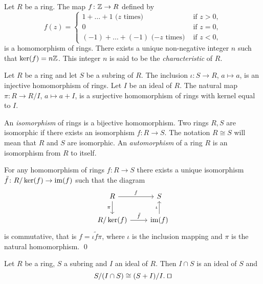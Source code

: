 \begin{example}
Let  $R$ be a ring. The map $f\colon \mathbb{Z}\rightarrow R$ defined by
\[
f(z)=\begin{cases}
    1+\dots +1\mbox{ ($z$ times)}&\mbox{ if } z>0,\\
    0 &\mbox{ if } z=0,\\
    (-1)+\dots+(-1) \mbox{ ($-z$ times)}&\mbox{ if } z<0,
    \end{cases}
\]
is a homomorphism of rings. There exists a unique non-negative integer $n$ such that
$\ker(f)=n\mathbb{Z}$. 
This integer $n$ is said to be the {\em characteristic} of $R$.
\end{example}

\begin{example} 
Let $R$ be a ring and let $S$ be a subring of $R$. The inclusion $\iota\colon S\rightarrow R$, $a\mapsto a$, is an injective homomorphism of rings. Let $I$ be an ideal of $R$. The natural map $\pi\colon R\rightarrow R/I$, $a\mapsto a+I$, is a surjective homomorphism of rings with kernel equal to $I$.  
\end{example}

An {\em isomorphism} of rings is a bijective homomorphism. Two rings $R,S$ are isomorphic if there exists an isomorphism $f\colon R\rightarrow S$. The notation $R\cong S$ will mean that $R$ and $S$ are isomorphic. An {\em automorphism} of a ring $R$ is an isomorphism from $R$ to itself. 

\begin{theorem}
	For any homomorphism of rings $f\colon R\rightarrow S$ there exists a unique isomorphism 
	$\tilde f\colon R/\ker(f)\rightarrow\operatorname{im}(f)$ such that the diagram
	\[\begin{tikzcd}
		{R} & {S} \\
		{R/\ker(f)} & {\im(f)}
		\arrow["f", from=1-1, to=1-2]
		\arrow["{\pi}"', from=1-1, to=2-1]
		\arrow["{\iota}", from=2-2, to=1-2]
		\arrow["{\tilde f}", from=2-1, to=2-2]
	\end{tikzcd}
	\]
	is commutative, that is $f=\iota \tilde f\pi$, where $\iota$ 
	is the inclusion mapping and $\pi$ is the natural homomorphism. \qed	
\end{theorem} 

\begin{theorem}
Let $R$ be a ring,  $S$ a subring and $I$ an ideal of $R$. Then $I\cap S$ is an ideal of $S$ and
	$$S/(I\cap S)\cong (S+I)/I. \; \qed$$  
\end{theorem}

